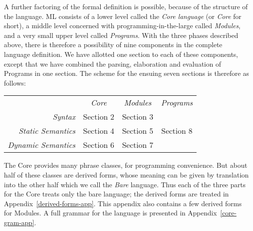 A further factoring of the formal definition is possible,
because of the structure of the language.  ML consists of a lower level
called the {\sl Core language} (or {\sl Core} for short), a middle level
concerned  with programming-in-the-large called {\sl Modules},
and a very small upper level called {\sl Programs}.
With the three phases described above, there is therefore
a possibility of nine components in the
complete language definition. We have allotted one section to each
of these components, except that we have combined the parsing,
elaboration and evaluation of Programs in one section. The
scheme for the ensuing seven sections is therefore as follows:

\vspace*{3mm}
\begin{tabular}{rccc}
                & {\em Core} & {\em Modules} & {\em Programs} \\
\cline{2-4}
{\em Syntax}    &\multicolumn{1}{|c}{Section 2}
                             &\multicolumn{1}{|c}{Section 3}
                                             &\multicolumn{1}{|c|}{ }\\
\cline{2-3}
{\em Static Semantics}
                &\multicolumn{1}{|c}{Section 4}
                             &\multicolumn{1}{|c}{Section 5}
                                             &\multicolumn{1}{|c|}{Section 8}\\
\cline{2-3}
{\em Dynamic Semantics}
                &\multicolumn{1}{|c}{Section 6}
                             &\multicolumn{1}{|c}{Section 7}
                                             &\multicolumn{1}{|c|}{}\\
\cline{2-4}
\end{tabular}
\vspace*{3mm}


The Core provides many phrase classes, for programming convenience.
But about half of these classes are derived forms, whose meaning can be
given by translation into the other half which we call the
{\sl Bare} language.   
Thus each of the three parts for the Core treats only the bare language;
the derived forms are treated in  Appendix~\ref{derived-forms-app}.
This appendix also contains a few derived forms for Modules.
A full grammar for the language is presented in
Appendix~\ref{core-gram-app}.

